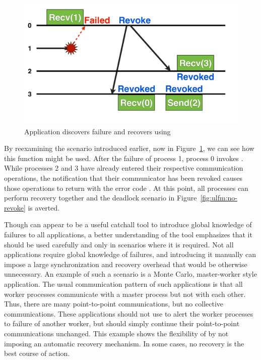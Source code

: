 \begin{figure}[t]
    \centering
    \includegraphics[width=\linewidth]{figures/Revoke}
    \caption{Application discovers failure and recovers using }
    \label{fig:ulfm:revoke}
\end{figure}

By reexamining the scenario introduced earlier, now in
Figure~\ref{fig:ulfm:revoke}, we can see how this function might be used. After
the failure of process 1, process 0 invokes .  While
processes 2 and 3 have already entered their respective communication
operations, the notification that their communicator has been revoked causes
those  operations to return with the error code
. At this point, all processes can perform recovery
together and the deadlock scenario in Figure~\ref{fig:ulfm:no-revoke} is averted.

Though  can appear to be a useful catchall tool to
introduce global knowledge of failures to all applications, a better
understanding of the tool emphasizes that it should be used carefully and only
in scenarios where it is required. Not all applications require global knowledge
of failures, and introducing it manually can impose a large synchronization and
recovery overhead that would be otherwise unnecessary. An example of such a
scenario is a Monte Carlo, master-worker style application. The usual
communication pattern of such applications is that all worker processes
communicate with a master process but not with each other. Thus, there are many
point-to-point communications, but no collective communications. These
applications should not use  to alert the worker
processes to failure of another worker, but should simply continue their point-to-point
communications unchanged. This example shows the flexibility of \ulfm by not
imposing an automatic recovery mechanism. In some cases, no recovery is the best
course of action.

